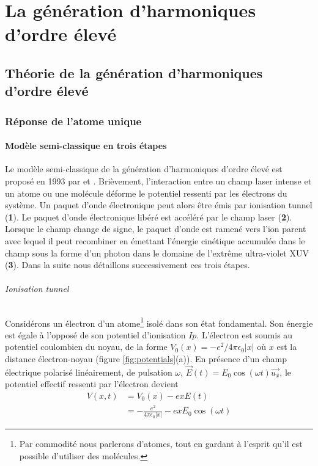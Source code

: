 
\part{La génération d'harmoniques d'ordre élevé}

\chapter{Théorie de la génération d'harmoniques d'ordre élevé}
\section{Réponse de l'atome unique}
\subsection{Modèle semi-classique en trois étapes}
Le modèle semi-classique de la génération d'harmoniques d'ordre élevé est proposé en 1993 par  et . Brièvement, l'interaction entre un champ laser intense et un atome ou une molécule déforme le potentiel ressenti par les électrons du système. Un paquet d'onde électronique peut alors être émis par ionisation tunnel (\textbf{1}). Le paquet d'onde électronique libéré est accéléré par le champ laser (\textbf{2}). Lorsque le champ change de signe, le paquet d'onde est ramené vers l'ion parent avec lequel il peut recombiner en émettant l'énergie cinétique accumulée dans le champ sous la forme d'un photon dans le domaine de l'extrême ultra-violet XUV (\textbf{3}). Dans la suite nous détaillons successivement ces trois étapes.

\paragraph{Ionisation tunnel} Considérons un électron d'un atome\footnote{Par commodité nous parlerons d'atomes, tout en gardant à l'esprit qu'il est possible d'utiliser des molécules.} isolé dans son état fondamental. Son énergie est égale à l'opposé de son potentiel d'ionisation $Ip$. L'électron est soumis au potentiel coulombien du noyau, de la forme $V_0 (x) = - e^2 /4\pi \epsilon_0 |x|$ où $x$ est la distance électron-noyau (figure \ref{fig:potentials}(a)). En présence d'un champ électrique polarisé linéairement, de pulsation $\omega$, $\vec{E}(t) = E_0 \cos(\omega t) \vec{u_x}$, le potentiel effectif ressenti par l'électron devient
\begin{align}
V(x,t) & = V_0 (x) - e x E(t) \\
& = -\frac{e^2}{4\pi \epsilon_0 |x|} - e x E_0 \cos(\omega t)
\label{eq:PotentielEffectif}
\end{align}

